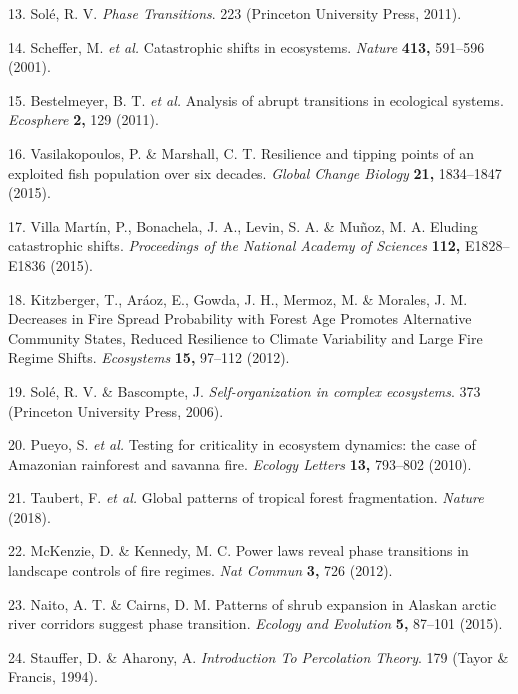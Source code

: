 \documentclass[]{article}
\begin{document}
\hypertarget{ref-Sole2011}{}
13. Solé, R. V. \emph{Phase Transitions}. 223 (Princeton University
Press, 2011).

\hypertarget{ref-Scheffer2001}{}
14. Scheffer, M. \emph{et al.} Catastrophic shifts in ecosystems.
\emph{Nature} \textbf{413,} 591--596 (2001).

\hypertarget{ref-Bestelmeyer2011}{}
15. Bestelmeyer, B. T. \emph{et al.} Analysis of abrupt transitions in
ecological systems. \emph{Ecosphere} \textbf{2,} 129 (2011).

\hypertarget{ref-Vasilakopoulos2015}{}
16. Vasilakopoulos, P. \& Marshall, C. T. Resilience and tipping points
of an exploited fish population over six decades. \emph{Global Change
Biology} \textbf{21,} 1834--1847 (2015).

\hypertarget{ref-VillaMartin2015}{}
17. Villa Martín, P., Bonachela, J. A., Levin, S. A. \& Muñoz, M. A.
Eluding catastrophic shifts. \emph{Proceedings of the National Academy
of Sciences} \textbf{112,} E1828--E1836 (2015).

\hypertarget{ref-Kitzberger2012}{}
18. Kitzberger, T., Aráoz, E., Gowda, J. H., Mermoz, M. \& Morales, J.
M. Decreases in Fire Spread Probability with Forest Age Promotes
Alternative Community States, Reduced Resilience to Climate Variability
and Large Fire Regime Shifts. \emph{Ecosystems} \textbf{15,} 97--112
(2012).

\hypertarget{ref-Sole2006}{}
19. Solé, R. V. \& Bascompte, J. \emph{Self-organization in complex
ecosystems}. 373 (Princeton University Press, 2006).

\hypertarget{ref-Pueyo2010}{}
20. Pueyo, S. \emph{et al.} Testing for criticality in ecosystem
dynamics: the case of Amazonian rainforest and savanna fire.
\emph{Ecology Letters} \textbf{13,} 793--802 (2010).

\hypertarget{ref-Taubert2018}{}
21. Taubert, F. \emph{et al.} Global patterns of tropical forest
fragmentation. \emph{Nature} (2018).

\hypertarget{ref-McKenzie2012}{}
22. McKenzie, D. \& Kennedy, M. C. Power laws reveal phase transitions
in landscape controls of fire regimes. \emph{Nat Commun} \textbf{3,} 726
(2012).

\hypertarget{ref-Naito2015}{}
23. Naito, A. T. \& Cairns, D. M. Patterns of shrub expansion in Alaskan
arctic river corridors suggest phase transition. \emph{Ecology and
Evolution} \textbf{5,} 87--101 (2015).

\hypertarget{ref-Stauffer1994}{}
24. Stauffer, D. \& Aharony, A. \emph{Introduction To Percolation
Theory}. 179 (Tayor \& Francis, 1994).
\end{document}
